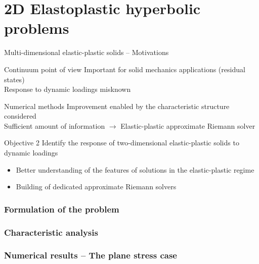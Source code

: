 \documentclass[11pt,aspectratio=169]{beamer}
\makeatletter
\let\oldpart\part
\def\part#1{\def\@currentlabelname{#1}\oldpart{#1}}
\makeatother
\begin{document}
\part{2D Elastoplastic hyperbolic problems}
\label{part:part2}
\begin{frame}{Multi-dimensional elastic-plastic solids -- Motivations}
  
  \begin{block}{Continuum point of view}
    Important for solid mechanics applications (residual states)\\
    Response to dynamic loadings misknown %
  \end{block}
  
  \begin{block}{Numerical methods}
    Improvement enabled by the characteristic structure considered \\
    Sufficient amount of information \alert{$\rightarrow$ Elastic-plastic approximate Riemann solver}
  \end{block}
  \pause
  \begin{block}{Objective 2}
    Identify the response of two-dimensional elastic-plastic solids to dynamic loadings
    \begin{itemize}
    \item Better understanding of the features of solutions in the elastic-plastic regime
    \item Building of dedicated approximate Riemann solvers
    \end{itemize}
  \end{block}
\end{frame}

\section{Formulation of the problem}


\section{Characteristic analysis}


\section{Numerical results -- The plane stress case}

\end{document}
